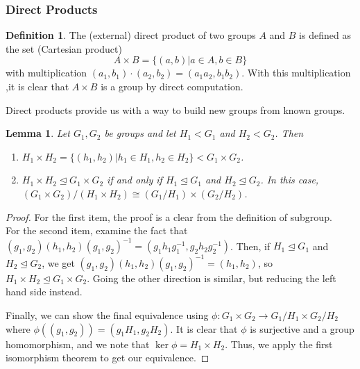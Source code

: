 \documentclass[11pt,leqno,oneside]{amsart}
\newcommand{\subgroup}{\mathrel{<}}
\newcommand{\normsubgroup}{\mathrel{\unlhd}}
\newcommand{\isom}{\mathrel{\cong}}
\newtheorem{lem}[thm]{Lemma}
\theoremstyle{definition}
\newtheorem{defn}[thm]{Definition}
\numberwithin{equation}{section}
\begin{document}
\subsubsection*{Direct Products}

\begin{defn}
    The (external) direct product of two groups $A$ and $B$ is defined as the set (Cartesian product) \[
        A \times B = \{(a,b) | a \in A, b \in B \}
    \] with multiplication $(a_1,b_1) \cdot (a_2,b_2) = (a_1a_2,b_1b_2)$. With this multiplication ,it is clear that $A \times B$ is a group by direct computation.
\end{defn}

Direct products provide us with a way to build new groups from known groups.

\begin{lem}
    Let $G_1, G_2$ be groups and let $H_1 \subgroup G_1$ and $H_2 \subgroup G_2$. Then
    \begin{enumerate}[label=(\alph*)]
        \item $H_1 \times H_2 = \{(h_1,h_2) | h_1 \in H_1, h_2 \in H_2\} \subgroup G_1 \times G_2$.
        \item $H_1 \times H_2 \normsubgroup G_1 \times G_2$ if and only if $H_1 \normsubgroup G_1$ and $H_2 \normsubgroup G_2$. In this case, $(G_1 \times G_2)/(H_1 \times H_2) \isom (G_1/H_1) \times (G_2/H_2)$.
    \end{enumerate}
\end{lem}
\begin{proof}
    For the first item, the proof is a clear from the definition of subgroup. \\

    For the second item, examine the fact that
    $(g_1,g_2)(h_1,h_2)(g_1,g_2)^{-1} = (g_1h_1g_1^{-1},g_2h_2g_2^{-1})$. Then,
    if $H_1 \normsubgroup G_1$ and $H_2 \normsubgroup G_2$, we get
    $(g_1,g_2)(h_1,h_2)(g_1,g_2)^{-1} = (h_1,h_2)$, so $H_1 \times H_2
    \normsubgroup G_1 \times G_2$. Going the other direction is similar, but
    reducing the left hand side instead.

    Finally, we can show the final equivalence using $\phi: G_1 \times G_2 \to
    G_1/H_1 \times G_2/H_2$ where $\phi( (g_1,g_2) ) = (g_1H_1, g_2H_2)$. It
    is clear that $\phi$ is surjective and a group homomorphism, and we note
    that $\ker \phi = H_1 \times H_2$. Thus, we apply the first isomorphism
    theorem to get our equivalence.
\end{proof}
\end{document}
